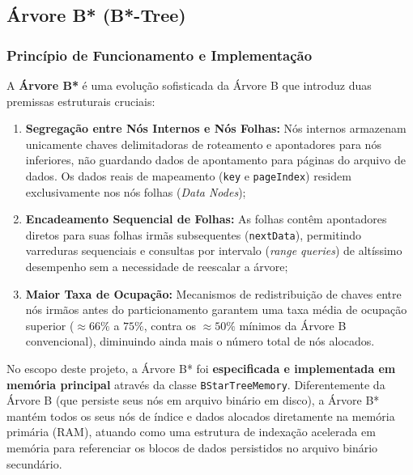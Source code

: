 \documentclass[12pt,a4paper]{article}
\begin{document}
\subsection{Árvore B* (B*-Tree)}
\label{subsec:bstar_tree}

\subsubsection{Princípio de Funcionamento e Implementação}
A \textbf{Árvore B*} é uma evolução sofisticada da Árvore B que introduz duas premissas estruturais cruciais:
\begin{enumerate}
    \item \textbf{Segregação entre Nós Internos e Nós Folhas:} Nós internos armazenam unicamente chaves delimitadoras de roteamento e apontadores para nós inferiores, não guardando dados de apontamento para páginas do arquivo de dados. Os dados reais de mapeamento (\texttt{key} e \texttt{pageIndex}) residem exclusivamente nos nós folhas (\textit{Data Nodes});
    \item \textbf{Encadeamento Sequencial de Folhas:} As folhas contêm apontadores diretos para suas folhas irmãs subsequentes (\texttt{nextData}), permitindo varreduras sequenciais e consultas por intervalo (\textit{range queries}) de altíssimo desempenho sem a necessidade de reescalar a árvore;
    \item \textbf{Maior Taxa de Ocupação:} Mecanismos de redistribuição de chaves entre nós irmãos antes do particionamento garantem uma taxa média de ocupação superior ($\approx 66\%$ a $75\%$, contra os $\approx 50\%$ mínimos da Árvore B convencional), diminuindo ainda mais o número total de nós alocados.
\end{enumerate}

No escopo deste projeto, a Árvore B* foi \textbf{especificada e implementada em memória principal} através da classe \texttt{BStarTreeMemory}. Diferentemente da Árvore B (que persiste seus nós em arquivo binário em disco), a Árvore B* mantém todos os seus nós de índice e dados alocados diretamente na memória primária (RAM), atuando como uma estrutura de indexação acelerada em memória para referenciar os blocos de dados persistidos no arquivo binário secundário.
\end{document}
